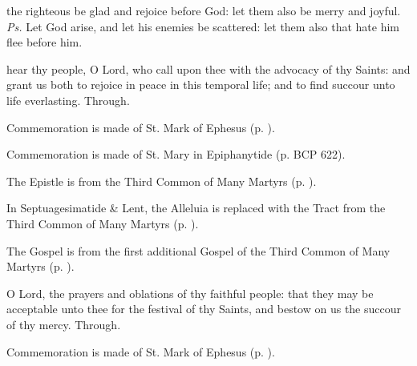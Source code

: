 \introit
{} the righteous be glad and rejoice before God: let them also be merry and joyful. \textit{Ps.} Let God arise, and let his enemies be scattered: let them also that hate him flee before him.

\collect
{} hear thy people, O Lord, who call upon thee with the advocacy of thy Saints: and grant us both to rejoice in peace in this temporal life; and to find succour unto life everlasting. Through.

\begin{rubric}
    Commemoration is made of St. Mark of Ephesus (p. \pageref{EphesianCollect}).
\end{rubric}

\begin{rubric}
    Commemoration is made of St. Mary in Epiphanytide (p. BCP 622).
\end{rubric}

\begin{rubric}
	The Epistle is from the Third Common of Many Martyrs (p. \pageref{CommonMartyrsIII}).
\end{rubric}


\begin{rubric}
	In Septuagesimatide \& Lent, the Alleluia is replaced with the Tract from the Third Common of Many Martyrs (p. \pageref{CommonMartyrsIII}).
\end{rubric}

\begin{rubric}
	The Gospel is from the first additional Gospel of the Third Common of Many Martyrs (p. \pageref{Matthew243}).
\end{rubric}


\secret
{} O Lord, the prayers and oblations of thy faithful people: that they may be acceptable unto thee for the festival of thy Saints, and bestow on us the succour of thy mercy. Through.

\begin{rubric}
    Commemoration is made of St. Mark of Ephesus (p. \pageref{EphesianSecret}).
\end{rubric}

